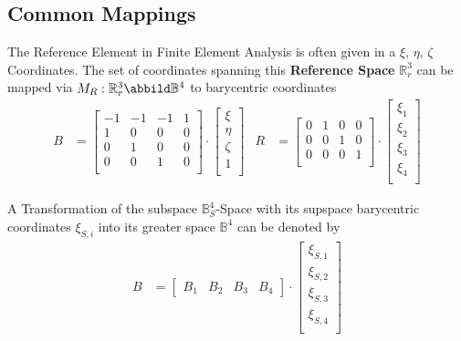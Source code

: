 \documentclass{mitschrift}
\newcommand{\R}{\mathbb{R}}
\newcommand{\Bary}{\mathbb{B}}
\begin{document}
\subsection{Common Mappings}

The Reference Element in Finite Element Analysis is often given in a $\xi,\, \eta,\, \zeta$ Coordinates. The set of coordinates
spanning this \textbf{Reference Space} $\R^3_{r}$ can be mapped via $M_R: \R^3_{r} \abbild \Bary^4$ to barycentric coordinates \begin{align}
    B &= \begin{bmatrix}
        -1 & -1 & -1 & 1\\
        1 & 0 & 0 & 0 \\
        0 & 1 & 0 & 0 \\
        0 & 0 & 1 & 0 \\
    \end{bmatrix} \cdot \begin{bmatrix}
        \xi \\
        \eta \\
        \zeta \\
        1 \\
    \end{bmatrix} & R &= \begin{bmatrix}
        0 & 1 & 0 & 0 \\
        0 & 0 & 1 & 0 \\
        0 & 0 & 0 & 1 \\
    \end{bmatrix} \cdot \begin{bmatrix}
        \xi_1 \\
        \xi_2 \\
        \xi_3 \\
        \xi_4 \\
    \end{bmatrix}
\end{align}

A Transformation of the subspace $\Bary^4_{S}$-Space  with its supspace barycentric coordinates $\xi_{S,i}$ into its greater space $\Bary^4$ can be denoted by \begin{align}
    B &= \begin{bmatrix}
        B_1 & B_2 & B_3 & B_4
    \end{bmatrix} \cdot \begin{bmatrix}
        \xi_{S,1} \\
        \xi_{S,2} \\
        \xi_{S,3} \\
        \xi_{S,4} \\   
    \end{bmatrix}
\end{align}
\end{document}
